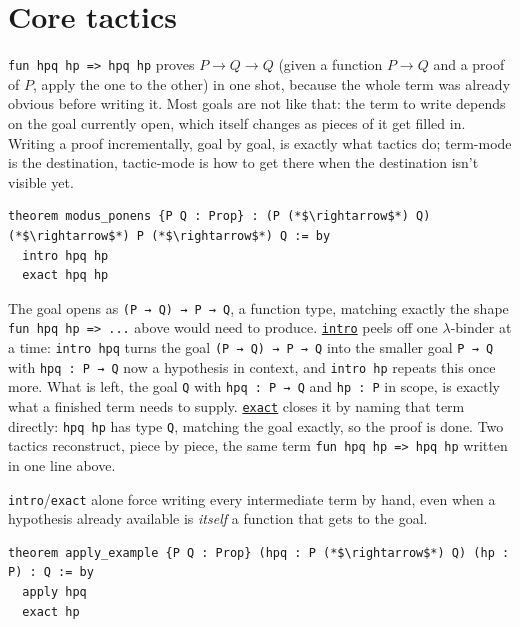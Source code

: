 \section{Core tactics}\label{sec:05-tactics:02-core-tactics:1}

\texttt{fun hpq hp => hpq hp} proves \(P\to Q\to Q\) (given a function \(P\to Q\) and a proof of \(P\), apply the one to the other) in one shot, because the whole term was already obvious before writing it. Most goals are not like that: the term to write depends on the goal currently open, which itself changes as pieces of it get filled in. Writing a proof incrementally, goal by goal, is exactly what tactics do; term-mode is the destination, tactic-mode is how to get there when the destination isn't visible yet.

\begin{lstlisting}
theorem modus_ponens {P Q : Prop} : (P (*$\rightarrow$*) Q) (*$\rightarrow$*) P (*$\rightarrow$*) Q := by
  intro hpq hp
  exact hpq hp
\end{lstlisting}

The goal opens as \texttt{(P → Q) → P → Q}, a function type, matching exactly the shape \texttt{fun hpq hp => ...} above would need to produce. \href{https://lean-lang.org/doc/reference/latest/Tactic-Proofs/Tactic-Reference/}{\texttt{intro}} peels off one \(\lambda\)-binder at a time: \texttt{intro hpq} turns the goal \texttt{(P → Q) → P → Q} into the smaller goal \texttt{P → Q} with \texttt{hpq : P → Q} now a hypothesis in context, and \texttt{intro hp} repeats this once more. What is left, the goal \texttt{Q} with \texttt{hpq : P → Q} and \texttt{hp : P} in scope, is exactly what a finished term needs to supply. \href{https://lean-lang.org/doc/reference/latest/Tactic-Proofs/Tactic-Reference/}{\texttt{exact}} closes it by naming that term directly: \texttt{hpq hp} has type \texttt{Q}, matching the goal exactly, so the proof is done. Two tactics reconstruct, piece by piece, the same term \texttt{fun hpq hp => hpq hp} written in one line above.

\texttt{intro}/\texttt{exact} alone force writing every intermediate term by hand, even when a hypothesis already available is \emph{itself} a function that gets to the goal.

\begin{lstlisting}
theorem apply_example {P Q : Prop} (hpq : P (*$\rightarrow$*) Q) (hp : P) : Q := by
  apply hpq
  exact hp
\end{lstlisting}

